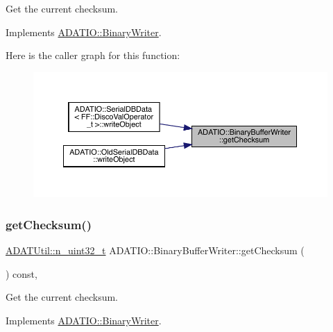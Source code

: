 Get the current checksum. 



Implements \mbox{\hyperlink{classADATIO_1_1BinaryWriter_a8bebb70a7248b14c8a4dcf7aa49c1503}{A\+D\+A\+T\+I\+O\+::\+Binary\+Writer}}.

Here is the caller graph for this function\+:
\nopagebreak
\begin{figure}[H]
\begin{center}
\leavevmode
\includegraphics[width=350pt]{d8/d90/classADATIO_1_1BinaryBufferWriter_a3d7ec1583f03981f0a84571646be46f3_icgraph}
\end{center}
\end{figure}
\mbox{\label{classADATIO_1_1BinaryBufferWriter_a3d7ec1583f03981f0a84571646be46f3}} 
\subsubsection{\texorpdfstring{getChecksum()}{getChecksum()}\hspace{0.1cm}{\footnotesize\ttfamily [2/3]}}
{\footnotesize\ttfamily \mbox{\hyperlink{namespaceADATUtil_ad945a8afa4db2d1f89b731964adae97e}{A\+D\+A\+T\+Util\+::n\+\_\+uint32\+\_\+t}} A\+D\+A\+T\+I\+O\+::\+Binary\+Buffer\+Writer\+::get\+Checksum (\begin{DoxyParamCaption}{ }\end{DoxyParamCaption}) const\hspace{0.3cm}{\ttfamily [inline]}, {\ttfamily [virtual]}}



Get the current checksum. 



Implements \mbox{\hyperlink{classADATIO_1_1BinaryWriter_a8bebb70a7248b14c8a4dcf7aa49c1503}{A\+D\+A\+T\+I\+O\+::\+Binary\+Writer}}.

